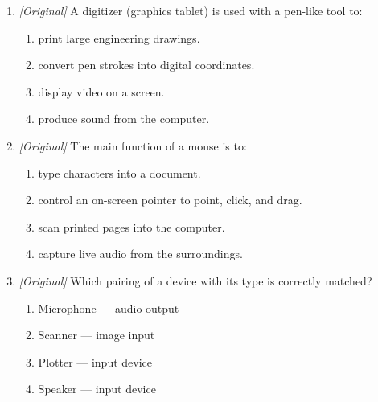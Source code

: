 \documentclass[11pt]{article}
\begin{document}
\begin{enumerate}[label=\textbf{Q\arabic*.}, leftmargin=*]
\begin{enumerate}[label=\Roman*.]
    \item A light pen is an input device.
    \item A plotter is an output device.
    \item A sound card supplies data to the computer as an input.
  \end{enumerate}
  \begin{enumerate}[label=\Alph*.]
    \item I and II only
    \item II and III only
    \item I and III only
    \item I, II and III
  \end{enumerate}
\item \textit{[Original]} A digitizer (graphics tablet) is used with a
  pen-like tool to:
  \begin{enumerate}[label=\Alph*.]
    \item print large engineering drawings.
    \item convert pen strokes into digital coordinates.
    \item display video on a screen.
    \item produce sound from the computer.
  \end{enumerate}
\item \textit{[Original]} The main function of a mouse is to:
  \begin{enumerate}[label=\Alph*.]
    \item type characters into a document.
    \item control an on-screen pointer to point, click, and drag.
    \item scan printed pages into the computer.
    \item capture live audio from the surroundings.
  \end{enumerate}
\item \textit{[Original]} Which pairing of a device with its type is correctly
  matched?
  \begin{enumerate}[label=\Alph*.]
    \item Microphone --- audio output
    \item Scanner --- image input
    \item Plotter --- input device
    \item Speaker --- input device
  \end{enumerate}


\end{enumerate}
\end{document}
